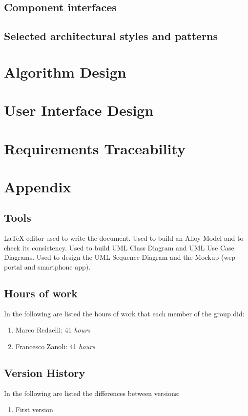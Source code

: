 \documentclass{../Common/Structure/doc_pdf}
\begin{document}
\section{Component interfaces}
\section{Selected architectural styles and patterns}


\chapter{Algorithm Design}
\chapter{User Interface Design}
\chapter{Requirements Traceability}


\appendix
\chapter{Appendix}

\section{Tools}
\begin{itemize}
	 \LaTeX{} editor used to write the document.
	 Used to build an Alloy Model and to check its consistency.
	 Used to build UML Class Diagram and UML Use Case Diagrams.
	 Used to design the UML Sequence Diagram and the Mockup (wep portal and smartphone app).
\end{itemize}
\newpage
\section{Hours of work}
In the following are listed the hours of work that each member of the group did:
\begin{enumerate}
	\item Marco Redaelli: 41 \emph{hours}
	\item Francesco Zanoli: 41 \emph{hours}
\end{enumerate}
\newpage
\section{Version History}
In the following are listed the differences between versions:
\begin{enumerate}
	\item First version
\end{enumerate}
\end{document}
